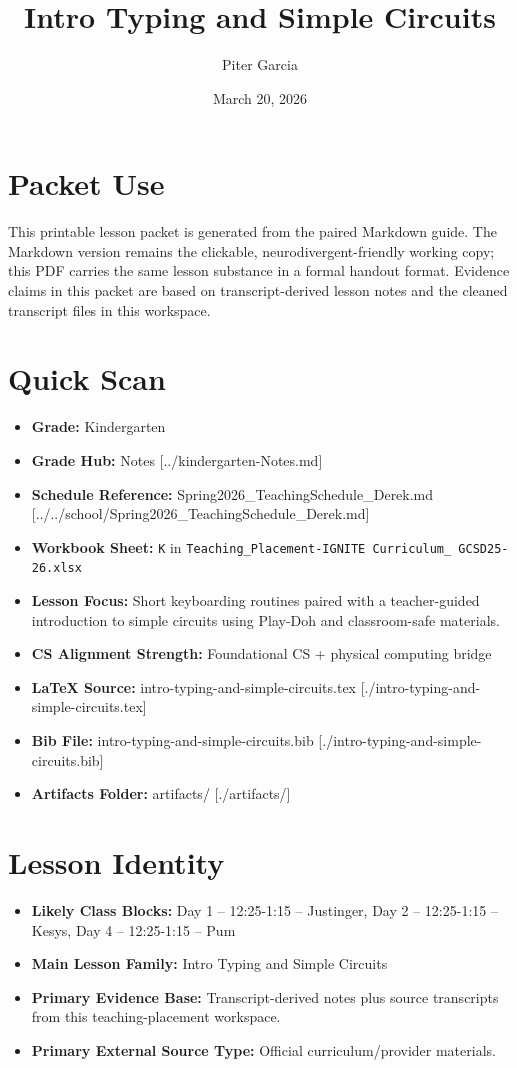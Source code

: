\documentclass[11pt]{article}
\title{Intro Typing and Simple Circuits}
\author{Piter Garcia}
\date{March 20, 2026}
\begin{document}
\maketitle
\section*{Packet Use}
This printable lesson packet is generated from the paired Markdown guide. The Markdown version remains the clickable, neurodivergent-friendly working copy; this PDF carries the same lesson substance in a formal handout format. Evidence claims in this packet are based on transcript-derived lesson notes and the cleaned transcript files in this workspace.

\section*{Quick Scan}
\begin{itemize}[leftmargin=*]
\item \textbf{Grade:} Kindergarten
\item \textbf{Grade Hub:} Notes [../kindergarten-Notes.md]
\item \textbf{Schedule Reference:} Spring2026\_TeachingSchedule\_Derek.md [../../school/Spring2026\_TeachingSchedule\_Derek.md]
\item \textbf{Workbook Sheet:} \texttt{K} in \texttt{Teaching\_Placement-IGNITE Curriculum\_ GCSD25-26.xlsx}
\item \textbf{Lesson Focus:} Short keyboarding routines paired with a teacher-guided introduction to simple circuits using Play-Doh and classroom-safe materials.
\item \textbf{CS Alignment Strength:} Foundational CS + physical computing bridge
\item \textbf{LaTeX Source:} intro-typing-and-simple-circuits.tex [./intro-typing-and-simple-circuits.tex]
\item \textbf{Bib File:} intro-typing-and-simple-circuits.bib [./intro-typing-and-simple-circuits.bib]
\item \textbf{Artifacts Folder:} artifacts/ [./artifacts/]
\end{itemize}

\section*{Lesson Identity}
\begin{itemize}[leftmargin=*]
\item \textbf{Likely Class Blocks:} Day 1 -- 12:25-1:15 -- Justinger, Day 2 -- 12:25-1:15 -- Kesys, Day 4 -- 12:25-1:15 -- Pum
\item \textbf{Main Lesson Family:} Intro Typing and Simple Circuits
\item \textbf{Primary Evidence Base:} Transcript-derived notes plus source transcripts from this teaching-placement workspace.
\item \textbf{Primary External Source Type:} Official curriculum/provider materials.
\end{itemize}
\end{document}
